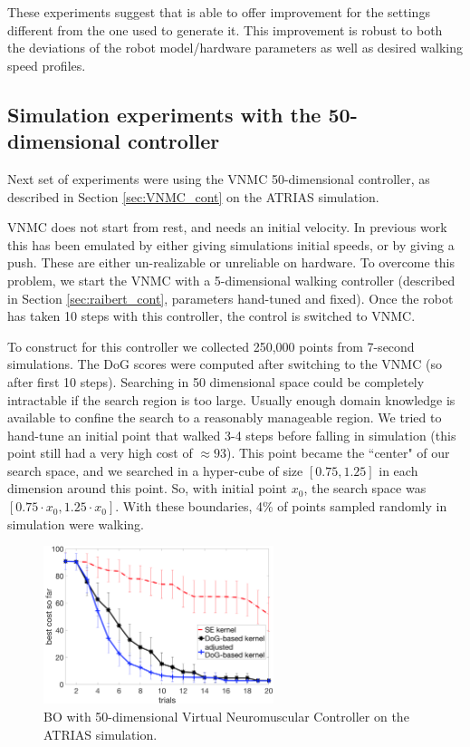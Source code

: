These experiments suggest that \dogkernel is able to offer improvement for the settings different from the one used to generate it. This improvement is robust to both the deviations of the robot model/hardware parameters as well as desired walking speed profiles.

\subsection{Simulation experiments with the 50-dimensional controller}

\label{sec:vnmc_expt}
Next set of experiments were using the VNMC 50-dimensional controller, as described in Section \ref{sec:VNMC_cont} on the ATRIAS simulation.

VNMC does not start from rest, and needs an initial velocity. In previous work this has been emulated by either giving simulations initial speeds, or by giving a push. These are either un-realizable or unreliable on hardware. To overcome this problem, we start the VNMC with a \mbox{5-dimensional} walking controller (described in Section \ref{sec:raibert_cont}, parameters hand-tuned and fixed). Once the robot has taken 10 steps with this controller, the control is switched to VNMC. 

To construct \dogkernel for this controller we collected 250,000 points from 7-second simulations. The DoG scores were computed after switching to the VNMC (so after first 10 steps). Searching in 50 dimensional space could be completely intractable if the search region is too large. Usually enough domain knowledge is available to confine the search to a reasonably manageable region. We tried to hand-tune an initial point that walked 3-4 steps before falling in simulation (this point still had a very high cost of $\approx\!\!93$). This point became the ``center" of our search space, and we searched in a hyper-cube of size $[0.75, 1.25]$ in each dimension around this point. So, with initial point $x_0$, the search space was $[0.75 \cdot x_0 , 1.25 \cdot x_0]$. With these boundaries, 4\% of points sampled randomly in simulation were walking.

\begin{figure}[t]
\centering
\includegraphics[width=0.6\textwidth]{img/sim_NM_Atrias_50d.png}
\caption{\small{BO with 50-dimensional Virtual Neuromuscular Controller on the ATRIAS simulation.}}
\label{fig:sim_NM_Atrias_50d}
\end{figure}

